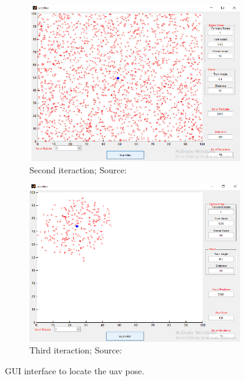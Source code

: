 \begin{figure}[H]
    \begin{subfigure}{0.49\textwidth}
        \includegraphics[width=\textwidth]{figures/gui_layout_mcl_2.png}
        \caption[Second iteraction]{Second iteraction; Source: \citet{sushant2017localization}}
    \end{subfigure}
    \hfill
    \begin{subfigure}{0.49\textwidth}
        \includegraphics[width=\textwidth]{figures/gui_layout_mcl_3.png}
        \caption[Third iteraction]{Third iteraction; Source: \citet{sushant2017localization}}
    \end{subfigure}
    \caption{GUI interface to locate the \gls*{uav} pose.}
\end{figure}
